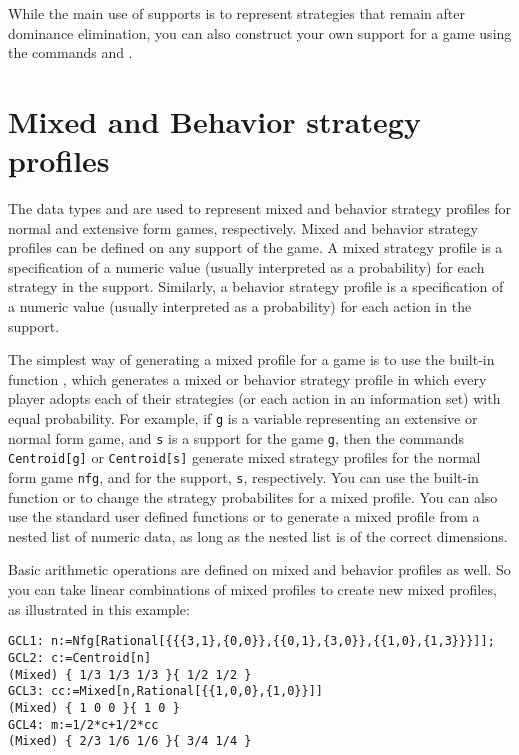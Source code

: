 While the main use of supports is to represent strategies that
remain after dominance elimination, you can also construct your own
support for a game using the commands  and
.

\section{Mixed and Behavior strategy profiles}

The data types  and  are used to represent
mixed and behavior strategy profiles for normal and extensive form
games, respectively.  Mixed and behavior strategy profiles can be
defined on any support of the game.  A mixed strategy profile is a
specification of a numeric value (usually interpreted as a
probability) for each strategy in the support.  Similarly, a behavior
strategy profile is a specification of a numeric value (usually
interpreted as a probability) for each action in the support.

The simplest way of generating a mixed profile for a game is to use
the built-in function , which generates a mixed or
behavior strategy profile in which every player adopts each of their
strategies (or each action in an information set) with equal
probability.  For example, if \verb+g+ is a variable representing an
extensive or normal form game, and \verb+s+ is a support for the game
\verb+g+, then the commands \verb+Centroid[g]+ or \verb+Centroid[s]+
generate mixed strategy profiles for the normal form game \verb+nfg+,
and for the support, \verb+s+, respectively.  You can use the built-in
function  or  to change
the strategy probabilites for a mixed profile.  You can also use the
standard user defined functions  or  to
generate a mixed profile from a nested list of numeric data, as long
as the nested list is of the correct dimensions.

Basic arithmetic operations are defined on mixed and behavior profiles
as well.  So you can take linear combinations of mixed profiles to
create new mixed profiles, as illustrated in this example:

\begin{verbatim}  
GCL1: n:=Nfg[Rational[{{{3,1},{0,0}},{{0,1},{3,0}},{{1,0},{1,3}}}]];
GCL2: c:=Centroid[n]
(Mixed) { 1/3 1/3 1/3 }{ 1/2 1/2 }
GCL3: cc:=Mixed[n,Rational[{{1,0,0},{1,0}}]]
(Mixed) { 1 0 0 }{ 1 0 }
GCL4: m:=1/2*c+1/2*cc
(Mixed) { 2/3 1/6 1/6 }{ 3/4 1/4 }
\end{verbatim}

